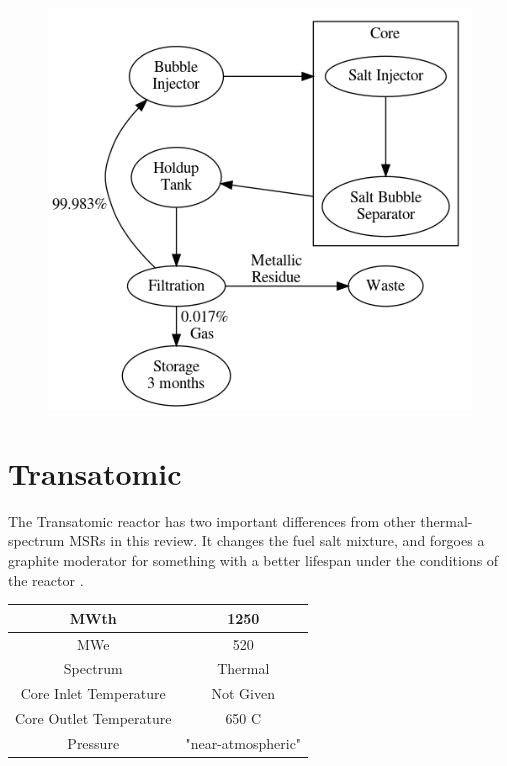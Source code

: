 \documentclass[letterpaper]{article}
\begin{document}
\begin{figure}[H]
  \centering
  \includegraphics[height=.5\textheight]{figures/msfr-offgas.png}
  \label{fig:figI}
\end{figure}

\section{Transatomic}

The Transatomic reactor has two important differences from other thermal-spectrum MSRs in this review.  It changes the fuel salt mixture, and forgoes a graphite moderator for something with a better lifespan under the conditions of the reactor \cite{robertson_assessment_2017} \cite{transatomic_power_corporation_neutronics_2016} \cite{transatomic_power_corporation_technical_2016}.

\begin{center}
\begin{tabular}{|c|c|}
\hline
MWth & 1250 \\
\hline
MWe & 520 \\
\hline
Spectrum & Thermal \\
\hline
Core Inlet Temperature & Not Given \\
\hline
Core Outlet Temperature & 650 C\\
\hline
Pressure & "near-atmospheric" \\
\hline
\end{tabular}
\end{center}
\end{document}
